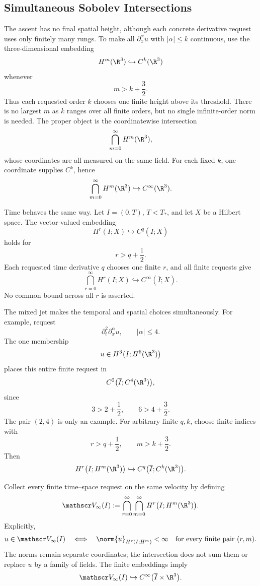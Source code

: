 
\subsection{Simultaneous Sobolev Intersections}\label{sub:SimultaneousSobolevIntersections}

The ascent has no final spatial height, although each concrete derivative request
uses only finitely many rungs.  To make all \(\partial_x^\alpha u\) with
\(\lvert\alpha\rvert\le k\) continuous, use the three-dimensional embedding
\[
  H^m(\R^3)
  \hookrightarrow
  C^k(\R^3)
\]
whenever
\[
  m>k+\frac32.
\]
Thus each requested order \(k\) chooses one finite height above its threshold.
There is no largest \(m\) as \(k\) ranges over all finite orders, but no single
infinite-order norm is needed.  The proper object is the coordinatewise
intersection
\[
  \bigcap_{m=0}^{\infty}H^m(\R^3),
\]
whose coordinates are all measured on the same field.  For each fixed \(k\),
one coordinate supplies \(C^k\), hence
\[
  \bigcap_{m=0}^{\infty}H^m(\R^3)
  \hookrightarrow
  C^\infty(\R^3).
\]

Time behaves the same way.  Let \(I=(0,T)\), \(T<T_*\), and let \(X\) be a
Hilbert space.
The vector-valued embedding
\[
  H^r(I;X)
  \hookrightarrow
  C^q(\overline I;X)
\]
holds for
\[
  r>q+\frac12.
\]
Each requested time derivative \(q\) chooses one finite \(r\), and all finite
requests give
\[
  \bigcap_{r=0}^{\infty}H^r(I;X)
  \hookrightarrow
  C^\infty(\overline I;X).
\]
No common bound across all \(r\) is asserted.

The mixed jet makes the temporal and spatial choices simultaneously.  For
example, request
\[
  \partial_t^2\partial_x^\alpha u,
  \qquad
  \lvert\alpha\rvert\le4.
\]
The one membership
\[
  u\in H^3\bigl(I;H^6(\R^3)\bigr)
\]
places this entire finite request in
\[
  C^2\bigl(\overline I;C^4(\R^3)\bigr),
\]
since
\[
  3>2+\frac12,
  \qquad
  6>4+\frac32.
\]
The pair \((2,4)\) is only an example.  For arbitrary finite \(q,k\), choose
finite indices with
\[
  r>q+\frac12,
  \qquad
  m>k+\frac32.
\]
Then
\[
  H^r\bigl(I;H^m(\R^3)\bigr)
  \hookrightarrow
  C^q\bigl(\overline I;C^k(\R^3)\bigr).
\]

Collect every finite time--space request on the same velocity by defining
\[
  \mathscr V_\infty(I)
  :=
  \bigcap_{r=0}^{\infty}
  \bigcap_{m=0}^{\infty}
  H^r\bigl(I;H^m(\R^3)\bigr).
\]
Explicitly,
\[
  u\in\mathscr V_\infty(I)
  \quad\Longleftrightarrow\quad
  \norm{u}_{H^r(I;H^m)}
  <
  \infty
  \quad
  \text{for every finite pair }(r,m).
\]
The norms remain separate coordinates; the intersection does not sum them or
replace \(u\) by a family of fields.  The finite embeddings imply
\[
  \mathscr V_\infty(I)
  \hookrightarrow
  C^\infty\bigl(\overline I\times\R^3\bigr).
\]

